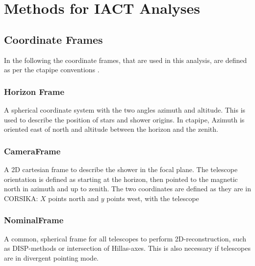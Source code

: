 \chapter{Methods for IACT Analyses}

\section{Coordinate Frames}
In the following the coordinate frames, that are used in this analysis,
are defined as per the ctapipe conventions \cite{karl_kosack_2019_3372211}.

\subsection{Horizon Frame}
A spherical coordinate system with the two angles azimuth and altitude.
This is used to describe the position of stars and shower origins.
In ctapipe, Azimuth is oriented east of north and altitude between the horizon 
and the zenith.

\subsection{CameraFrame}
A 2D cartesian frame to describe the shower in the focal plane.
The telescope orientation is defined as 
starting at the horizon, then pointed to the 
magnetic north in azimuth and up to zenith.
The two coordinates are defined as they are in CORSIKA:
$X$ points north and $y$ points west, with the telescope


\subsection{NominalFrame}
A common, spherical frame for all telescopes to perform 2D-reconstruction,
such as DISP-methods or intersection of Hillas-axes.
This is also necessary if telescopes are in divergent pointing mode.




